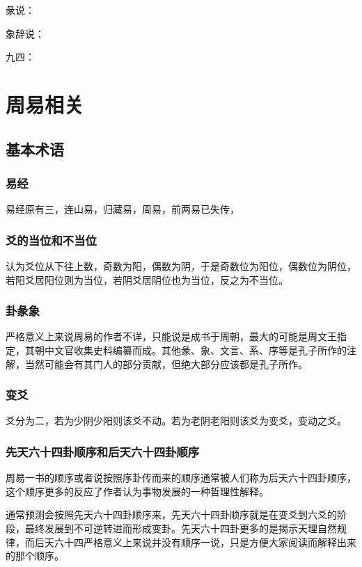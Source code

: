 \documentclass[12pt,oneside]{book}
\begin{document}
彖说：

象辞说：

九四：







\part{周易相关}
\chapter{基本术语}
\section{易经}
易经原有三，连山易，归藏易，周易，前两易已失传，

\section{爻的当位和不当位}
认为爻位从下往上数，奇数为阳，偶数为阴，于是奇数位为阳位，偶数位为阴位，若阳爻居阳位则为当位，若阴爻居阴位也为当位，反之为不当位。

\section{卦彖象}
严格意义上来说周易的作者不详，只能说是成书于周朝，最大的可能是周文王指定，其朝中文官收集史料编纂而成。其他彖、象、文言、系、序等是孔子所作的注解，当然可能会有其门人的部分贡献，但绝大部分应该都是孔子所作。

\section{变爻}
爻分为二，若为少阴少阳则该爻不动。若为老阴老阳则该爻为变爻，变动之爻。

\section{先天六十四卦顺序和后天六十四卦顺序}
周易一书的顺序或者说按照序卦传而来的顺序通常被人们称为后天六十四卦顺序，这个顺序更多的反应了作者认为事物发展的一种哲理性解释。

通常预测会按照先天六十四卦顺序来，先天六十四卦顺序就是在变爻到六爻的阶段，最终发展到不可逆转进而形成变卦。先天六十四卦更多的是揭示天理自然规律，而后天六十四严格意义上来说并没有顺序一说，只是方便大家阅读而解释出来的那个顺序。
\end{document}
